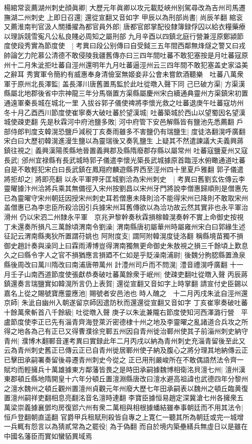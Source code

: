 楊綰常衮薦湖州刺史顔眞卿|{
	大歷元年眞卿以攻元載貶峽州别駕尋改為吉州司馬遷撫湖二州刺史}
上即日召還|{
	還從宣翻又音如字}
甲辰以為刑部尚書|{
	尚辰羊翻}
綰衮又薦淮南判官汲人關播擢為都官員外郎|{
	唐都官郎掌配役隸簿録俘囚以給衣糧藥療以理訴競雪寃凡公私良賤必周知之屬刑部}
九月辛酉以四鎮北庭行營兼涇原鄭潁節度使段秀實為節度使　|{
	考異曰段公别傳曰自受鉞三五年間西鄰無烽燧之警又曰戎帥論乞力陀慕公清德不敢侵陵我疆舊傳亦曰三四年間吐蕃不敢犯塞按是月吐蕃寇原州十二月朱泚拒吐蕃自涇州還明年九月吐蕃逼涇州云三四年間不敢犯塞盖史家溢美之辭耳}
秀實軍令簡約有威惠奉身清儉室無姬妾非公會未嘗飲酒聽樂　吐蕃八萬衆軍于原州北長澤監|{
	盖長澤川唐舊置馬監於此吐從暾入聲下同}
己巳破方渠|{
	方渠漢縣屬北地郡後省中宗神龍三年分馬嶺置方渠縣屬慶州宋白續通典靈州方渠鎮宋初置通遠軍秦長城在城北一里}
入拔谷郭子儀使禆將李懷光救之吐蕃退庚午吐蕃寇坊州　冬十月乙酉西川節度使崔寧奏大破吐蕃於望漢城|{
	吐蕃築城於西山以望蜀因名望漢城使疎吏翻}
先是秋霖河中府池鹽多敗|{
	河中府管下安邑解縣皆有鹽池先悉薦翻}
戶部侍郎判度支韓滉恐鹽戶減税丁亥奏雨雖多不害鹽仍有瑞鹽生|{
	度徒洛翻滉呼廣翻宋白曰大歷初韓滉進漫生鹽以為靈瑞後又奏乳鹽生}
上疑其不然遣諫議大夫義興蔣鎮往視之|{
	義興漢陽羨縣地晉置義興郡及縣隋廢郡存縣以屬常州}
吐蕃寇鹽夏州又寇長武|{
	邠州宜禄縣有長武城時郭子儀遣李懷光築長武城據原首臨涇水俯瞰通道吐蕃自是不敢輕犯宋白曰長武鎮在鳳翔府麟遊縣界西至涇州四十里夏戶雅翻}
郭子儀遣將拒却之|{
	將即亮翻}
以永平軍押牙匡城劉洽為宋州刺史　|{
	考異曰舊劉玄佐傳云李靈曜據汴州洽將兵乘其無備徑入宋州按劉昌以宋州牙門將說李僧惠歸順則是僧惠先已為靈曜守宋州朝廷因授宋州刺史耳若僧惠未降則洽不能得宋州已降則不敢取宋州盖僧惠已為李忠臣所殺洽因引兵據宋州耳舊傳欲以為洽功故云然其實非也永平軍治滑州}
仍以宋泗二州隸永平軍　京兆尹黎幹奏秋霖損稼韓滉奏幹不實上命御史按視丁未還奏所損凡三萬餘頃渭南令劉澡|{
	渭南縣唐初屬華州時屬雍州宋白曰郭緣生述征記云渭南縣夷狄所置謂苻姚也}
阿附度支|{
	謂阿附韓滉度徒洛翻}
稱縣境苗獨不損御史趙計奏與澡同上曰霖雨溥博豈得渭南獨無更命御史朱敖視之損三千餘頃上歎息久之曰縣令字人之官不損猶應言損廼不仁如是乎貶澡南浦尉|{
	後魏分朐䏰縣置漁泉縣後周改曰萬川隋改曰南浦唐帶萬州}
計澧州司戶而不問滉|{
	澧音禮滉呼廣翻}
十一月壬子山南西道節度使張獻恭奏破吐蕃萬餘衆于岷州|{
	使疎吏翻吐從暾入聲}
丙辰蔣鎮還奏言瑞鹽實如韓滉所言仍上表賀|{
	還從宣翻又音如字上時掌翻}
請宣付史臣錫以嘉名上從之賜號寶應靈應池|{
	賜號者安邑池也}
時人醜之　十二月丙戌朱泚自涇州還京師|{
	朱泚自幽州入朝遂留京師因遣防秋而還還從宣翻又音如字}
丁亥崔寧奏破吐蕃十餘萬衆斬首八千餘級|{
	吐從暾入聲}
庚子以朱泚兼隴右節度使知河西澤潞行營　平盧節度使李正已先有淄青齊海登萊沂密德棣十州之地及李靈曜之亂諸道合兵攻之所得之地各為己有正已又得曹濮徐兖鄆五州因自青州徙治鄆州使其子前淄州刺史納守青州|{
	濮博木翻鄆音運考異曰實録此年二月丙戌以納為青州刺史充淄青留後至此又云為青州刺史舊正已傳云正已自青州徙居鄆州使子納及腹心之將分理其地納傳云正已擊田承嗣署奏留後尋遷青州刺史今從之}
正已用刑嚴峻所在不敢偶語然法令齊一賦均而輕擁兵十萬雄據東方鄰藩皆畏之是時田承嗣據魏博相衛洺貝澶七州|{
	澶州漢東郡頓丘縣地隋開皇十六年分頓丘置澶淵縣唐改曰澶水避高祖諱也武德四年分黎州之澶水魏州之頓丘觀州置澶州貞觀元年州廢大歷七年田承嗣表以魏州之頓丘臨黄復置澶州嗣祥吏翻相息亮翻洺音名澶時連翻}
李寶臣據恒易趙定深冀滄七州各擁衆五萬梁崇義據襄鄧均房復郢六州有衆二萬相與相根據蟠結雖奉事朝廷而不用其法令|{
	恒戶登翻朝直遥翻}
官爵甲兵租賦刑殺皆自專之上寛仁一聽其所為朝廷或完一城增一兵輒有怨言以為猜貳常為之罷役|{
	為于偽翻}
而自於境内築壘繕兵無虛日以是雖在中國名藩臣而實如蠻貊異域焉

